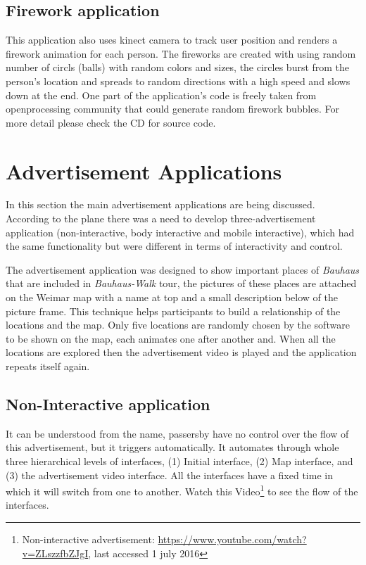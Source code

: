 \subsection{Firework application}
This application also uses kinect camera to track user position and renders a firework animation for each person.
The fireworks are created with using random number of circls (balls) with random colors and sizes, the circles burst from the person's location and spreads to random directions with a high speed and slows down at the end. One part of the application's code is freely taken from openprocessing community that could generate random firework bubbles.
For more detail please check the CD for source code.
\fi


\section{Advertisement Applications}
In this section the main advertisement applications are being discussed.
According to the plane there was a need to develop three-advertisement application (non-interactive, body interactive and mobile interactive), which had the same functionality but were different in terms of interactivity and control.

The advertisement application was designed to show important places of \emph{Bauhaus} that are included in \emph{Bauhaus-Walk} tour, the pictures of these places are attached on the Weimar map with a name at top and a small description below of the picture frame. This technique helps participants to build a relationship of the locations and the map. Only five locations are randomly chosen by the software to be shown on the map, each animates one after another and. When all the locations are explored then the advertisement video is played and the application repeats itself again.


\subsection{Non-Interactive application}
It can be understood from the name, passersby have no control over the flow of this advertisement, but it triggers automatically. It automates through whole three hierarchical levels of interfaces, (1) Initial interface, (2) Map interface, and (3) the advertisement video interface. All the interfaces have a fixed time in which it will switch from one to another. Watch this Video\footnote{Non-interactive advertisement: \url{https://www.youtube.com/watch?v=ZLszzfbZJgI}, last accessed 1 july 2016} to see the flow of the interfaces.



